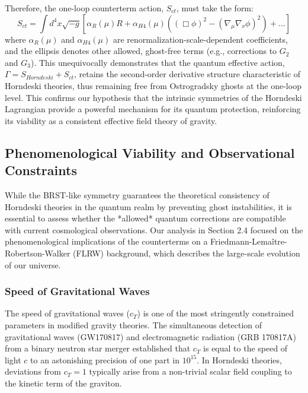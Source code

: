 \documentclass[twocolumn]{aastex631}
\begin{document}
Therefore, the one-loop counterterm action, $S_{ct}$, must take the form:
\begin{equation}
S_{ct} = \int d^4x \sqrt{-g} \left[ \alpha_R(\mu) R + \alpha_{H4}(\mu) \left( (\Box\phi)^2 - (\nabla_\mu\nabla_\nu\phi)^2 \right) + \dots \right]
\label{eq:counterterm_action}
\end{equation}
where $\alpha_R(\mu)$ and $\alpha_{H4}(\mu)$ are renormalization-scale-dependent coefficients, and the ellipsis denotes other allowed, ghost-free terms (e.g., corrections to $G_2$ and $G_3$). This unequivocally demonstrates that the quantum effective action, $\Gamma = S_{Horndeski} + S_{ct}$, retains the second-order derivative structure characteristic of Horndeski theories, thus remaining free from Ostrogradsky ghosts at the one-loop level. This confirms our hypothesis that the intrinsic symmetries of the Horndeski Lagrangian provide a powerful mechanism for its quantum protection, reinforcing its viability as a consistent effective field theory of gravity.

\subsection{Phenomenological Viability and Observational Constraints}
While the BRST-like symmetry guarantees the theoretical consistency of Horndeski theories in the quantum realm by preventing ghost instabilities, it is essential to assess whether the *allowed* quantum corrections are compatible with current cosmological observations. Our analysis in Section 2.4 focused on the phenomenological implications of the counterterms on a Friedmann-Lemaître-Robertson-Walker (FLRW) background, which describes the large-scale evolution of our universe.

\subsubsection{Speed of Gravitational Waves}
The speed of gravitational waves ($c_T$) is one of the most stringently constrained parameters in modified gravity theories. The simultaneous detection of gravitational waves (GW170817) and electromagnetic radiation (GRB 170817A) from a binary neutron star merger established that $c_T$ is equal to the speed of light $c$ to an astonishing precision of one part in $10^{15}$. In Horndeski theories, deviations from $c_T=1$ typically arise from a non-trivial scalar field coupling to the kinetic term of the graviton.
\end{document}
